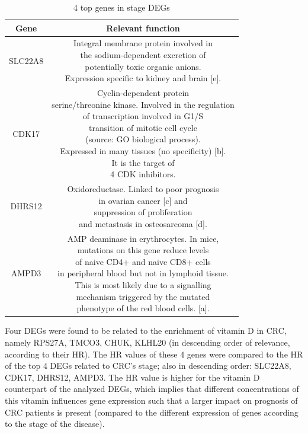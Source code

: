 \documentclass[fleqn,10pt]{SelfArx} %
\begin{document}
\begin{table}[ht]
	\small
	\centering
	\begin{tabular}{cc}
		\hline
		Gene & Relevant function\\
		\hline
		SLC22A8 & \makecell{Integral membrane protein involved in\\the sodium-dependent excretion of\\potentially toxic organic anions.\\Expression specific to kidney and brain [e].}\\
		CDK17 & \makecell{Cyclin-dependent protein \\serine/threonine kinase. Involved in the regulation \\of transcription involved in G1/S\\transition of mitotic cell cycle\\(source: GO biological process).\\Expressed in many tissues (no specificity) [b].\\It is the target of\\4 CDK inhibitors.}\\
		DHRS12 & \makecell{Oxidoreductase. Linked to poor prognosis\\in ovarian cancer [c] and\\suppression of proliferation\\and metastasis in osteosarcoma [d].}\\
		AMPD3 & \makecell{AMP deaminase in erythrocytes. In mice,\\mutations on this gene reduce levels\\of naive CD4+ and naive CD8+ cells\\in peripheral blood but not in lymphoid tissue.\\This is most likely due to a signalling\\mechanism triggered by the mutated\\phenotype of the red blood cells. [a].}\\
		\hline
	\end{tabular}
	\caption{4 top genes in stage DEGs}
	\label{tab:deg_char}
\end{table}
Four DEGs were found to be related to the enrichment of vitamin D in CRC, namely RPS27A, TMCO3, CHUK, KLHL20 (in descending order of relevance, according to their HR). The HR values of these 4 genes were compared to the HR of the top 4 DEGs related to CRC’s stage; also in descending order: SLC22A8, CDK17, DHRS12, AMPD3. The HR value is higher for the vitamin D counterpart of the analyzed DEGs, which implies that different concentrations of this vitamin influences gene expression such that a larger impact on prognosis of CRC patients is present (compared to the different expression of genes according to the stage of the disease).
\end{document}
